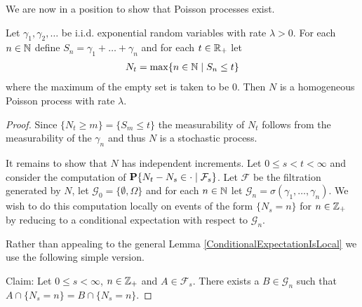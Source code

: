 We are now in a position to show that Poisson processes exist.  
\begin{thm}\label{HomogeneousPoissonProcessExistence}Let $\gamma_1,
  \gamma_2, \dotsc$ be i.i.d. exponential random variables with rate
  $\lambda > 0$.  For each $n \in \naturals$ define $S_n = \gamma_1 +
  \dotsc + \gamma_n$ and for each $t \in \reals_+$ let 
\begin{align*}
N_t = \max  \lbrace n \in \naturals \mid S_n \leq t \rbrace
\end{align*}
where the maximum of the empty set is taken to be $0$.  
Then $N$ is a homogeneous Poisson process with rate $\lambda$.
\end{thm}
\begin{proof}
Since $\lbrace N_t \geq m \rbrace = \lbrace S_m \leq t \rbrace$ the
measurability of $N_t$ follows from the measurability of the
$\gamma_n$ and thus $N$ is a stochastic process.  

It remains to
show that $N$ has independent increments.  Let $0 \leq s < t < \infty$
and consider the computation of $\cprobability{\mathcal{F}_s}{N_t
  - N_s \in \cdot}$. 
Let $\mathcal{F}$ be the filtration generated by $N$, let
$\mathcal{G}_0 = \lbrace \emptyset, \Omega \rbrace$ and for each $n
\in \naturals$ let $\mathcal{G}_n = \sigma(\gamma_1, \dotsc,
\gamma_n)$.   We wish to do this computation locally on events of the
form $\lbrace N_s = n \rbrace$ for $n \in \integers_+$ by reducing to
a conditional expectation with respect to $\mathcal{G}_n$.  

Rather than appealing to the general Lemma
\ref{ConditionalExpectationIsLocal} we use the following simple version.

Claim: Let $0 \leq s < \infty$, $n \in \integers_+$ and $A \in
\mathcal{F}_s$.  There exists a $B \in \mathcal{G}_n$ such that $A
\cap \lbrace N_s = n \rbrace = B \cap \lbrace N_s = n \rbrace$.


\end{proof}
